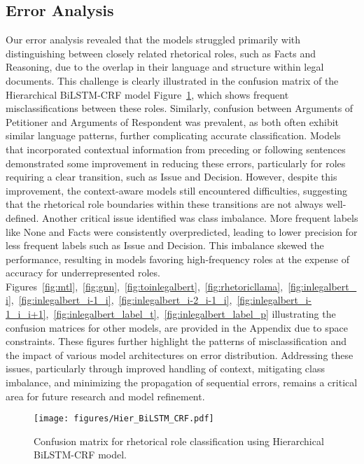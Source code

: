 \subsection{Error Analysis}
Our error analysis revealed that the models struggled primarily with distinguishing between closely related rhetorical roles, such as Facts and Reasoning, due to the overlap in their language and structure within legal documents. This challenge is clearly illustrated in the confusion matrix of the Hierarchical BiLSTM-CRF model Figure~\ref{fig:hier_bilstm_crf}, which shows frequent misclassifications between these roles. Similarly, confusion between Arguments of Petitioner and Arguments of Respondent was prevalent, as both often exhibit similar language patterns, further complicating accurate classification. Models that incorporated contextual information from preceding or following sentences demonstrated some improvement in reducing these errors, particularly for roles requiring a clear transition, such as Issue and Decision. However, despite this improvement, the context-aware models still encountered difficulties, suggesting that the rhetorical role boundaries within these transitions are not always well-defined. Another critical issue identified was class imbalance. More frequent labels like None and Facts were consistently overpredicted, leading to lower precision for less frequent labels such as Issue and Decision. This imbalance skewed the performance, resulting in models favoring high-frequency roles at the expense of accuracy for underrepresented roles.
Figures~\ref{fig:mtl},~\ref{fig:gnn},~\ref{fig:toinlegalbert},~\ref{fig:rhetoricllama},~\ref{fig:inlegalbert_i},~\ref{fig:inlegalbert_i-1_i},~\ref{fig:inlegalbert_i-2_i-1_i},~\ref{fig:inlegalbert_i-1_i_i+1},~\ref{fig:inlegalbert_label_t},~\ref{fig:inlegalbert_label_p} illustrating the confusion matrices for other models, are provided in the Appendix due to space constraints. These figures further highlight the patterns of misclassification and the impact of various model architectures on error distribution. Addressing these issues, particularly through improved handling of context, mitigating class imbalance, and minimizing the propagation of sequential errors, remains a critical area for future research and model refinement.
\begin{figure}[t]
    \centering
    \texttt{[image: figures/Hier\_BiLSTM\_CRF.pdf]}
    \caption{Confusion matrix for rhetorical role classification using Hierarchical BiLSTM-CRF model.}
    \label{fig:hier_bilstm_crf}
\end{figure}
